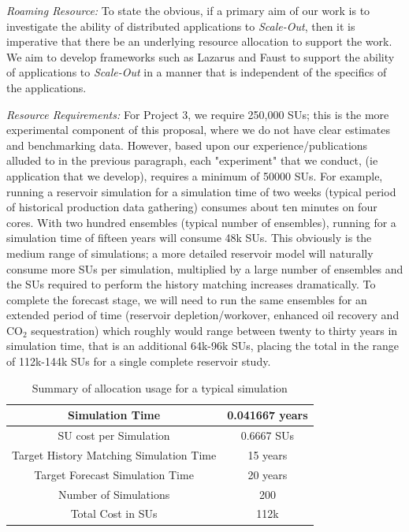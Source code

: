 \documentclass[a4paper,10pt]{article}
\begin{document}
{\it Roaming Resource:} To state the obvious, if a primary aim of our work is to investigate the ability of distributed applications to {\it Scale-Out}, then it is imperative that there be an underlying resource allocation to support the work. We aim to develop frameworks such as Lazarus and Faust to support the ability of applications to {\it Scale-Out} in a manner that is independent of the specifics of the applications.


{\it Resource Requirements:} For Project 3, we require 250,000 SUs; this is the more experimental component of this proposal, where we do not have clear estimates and benchmarking data. However, based upon our experience/publications alluded to in the previous paragraph, each "experiment" that we conduct, (ie application that we develop), requires a minimum of 50000 SUs. For example, running a reservoir simulation for a simulation
time of two weeks (typical period of historical production data gathering) consumes about ten minutes on four cores. 
With two hundred ensembles (typical number of ensembles), running for a simulation time of fifteen years will consume
48k SUs. This obviously is the medium range of simulations; a more detailed reservoir model
will naturally consume more SUs per simulation, multiplied by a large number of ensembles and the SUs required
to perform the history matching increases dramatically. To complete the forecast stage, we will need to run
the same ensembles for an extended period of time (reservoir depletion/workover, enhanced oil recovery and
CO$_2$ sequestration) which roughly would range between twenty to thirty years in simulation time, that is
an additional 64k-96k SUs, placing the total in the range of 112k-144k SUs for a single complete reservoir study.

\begin{table}[!h]
\begin{center}
 \caption{Summary of allocation usage for a typical simulation}
\begin{tabular}{| c | c |}
\hline
Simulation Time & 0.041667 years \\ 
\hline
SU cost per Simulation & 0.6667 SUs \\ 
\hline
Target History Matching Simulation Time & 15 years \\ 
\hline
Target Forecast Simulation Time & 20 years \\ 
\hline
Number of Simulations & 200 \\ 
\hline
Total Cost in SUs & 112k\\
\hline
\end{tabular}
\end{center}
\end{table}
\end{document}
